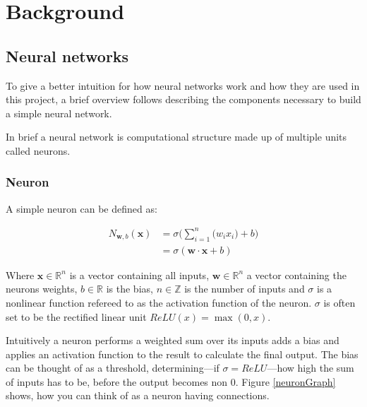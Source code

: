 
\newcommand{\neuronSum}[1][n]{
	\sigma\Bigg(\sum_{i=1}^{#1}{\Big(w_i x_i\Big)} + b\Bigg)
}

\chapter{Background}
\section{Neural networks}
To give a better intuition for how neural networks work and how they are used in this project, a brief overview follows describing the components necessary to build a simple neural network.

In brief a neural network is computational structure made up of multiple units called neurons.


\subsection{Neuron}
A simple neuron can be defined as:

\begin{equation}
\begin{split}
	N_{\bm w, b}(\bm{x}) & = \neuronSum[n] \\
 	& = \sigma (\bm{w} \cdot \bm{x} + b)
\end{split}
\end{equation}

Where $\bm{x} \in \mathbb{R}^n$ is a vector containing all inputs, $ \bm{w} \in \mathbb{R}^n$ a vector containing the neurons weights, $b \in \mathbb{R}$ is the bias, $n \in \mathbb{Z}$ is the number of inputs and $\sigma$ is a nonlinear function refereed to as the activation function of the neuron. $\sigma$ is often set to be the rectified linear unit $ReLU(x) = \max(0, x)$.

Intuitively a neuron performs a weighted sum over its inputs adds a bias and applies an activation function to the result to calculate the final output. The bias can be thought of as a threshold, determining---if $\sigma = ReLU$---how high the sum of inputs has to be, before the output becomes non 0. Figure \ref{neuronGraph} shows, how you can think of as a neuron having connections.

\neuronGraph{p}{$\displaystyle{\neuronSum[3]}$}


